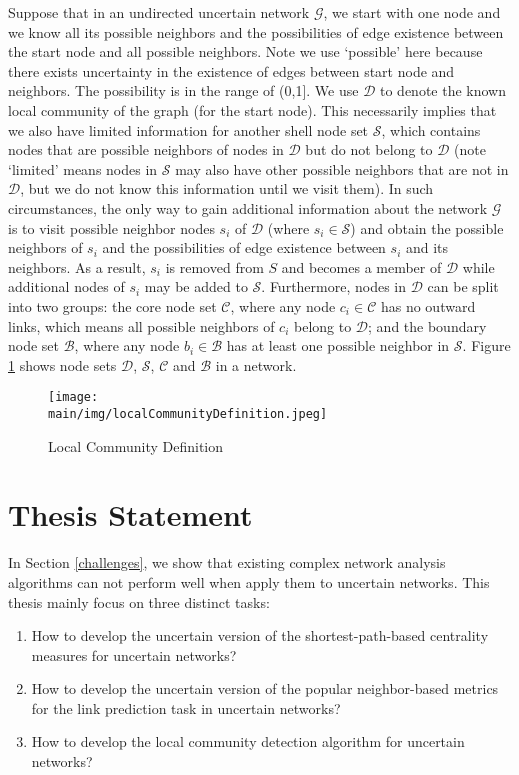 \documentclass[\main/thesis.tex]{subfiles}
\begin{document}
Suppose that in an undirected uncertain network $\mathcal{G}$, we start with one node and we know all its possible neighbors and the possibilities of edge existence between the start node and all possible neighbors. Note we use `possible' here because there exists uncertainty in the existence of edges between start node and neighbors. The possibility is in the range of (0,1]. We use $\mathcal{D}$ to denote the known local community of the graph (for the start node). This necessarily implies that we also have limited information for another shell node set $\mathcal{S}$, which contains nodes that are possible neighbors of nodes in $\mathcal{D}$ but do not belong to $\mathcal{D}$ (note `limited' means nodes in $\mathcal{S}$ may also have other possible neighbors that are not in $\mathcal{D}$, but we do not know this information until we visit them). In such circumstances, the only way to gain additional information about the network $\mathcal{G}$ is to visit possible neighbor nodes $s_i$ of $\mathcal{D}$ (where $s_i\in \mathcal{S}$) and obtain the possible neighbors of $s_i$ and the possibilities of edge existence between $s_i$ and its neighbors. As a result, $s_i$ is removed from $S$ and becomes a member of $\mathcal{D}$ while additional nodes of $s_i$ may be added to $\mathcal{S}$. Furthermore, nodes in $\mathcal{D}$ can be split into two groups: the core node set $\mathcal{C}$, where any node $c_i\in \mathcal{C}$ has no outward links, which means all possible neighbors of $c_i$ belong to $\mathcal{D}$; and the boundary node set $\mathcal{B}$, where any node $b_i\in \mathcal{B}$ has at least one possible neighbor in $\mathcal{S}$. Figure \ref{Local_Community_Definition} shows node sets $\mathcal{D}$, $\mathcal{S}$, $\mathcal{C}$ and $\mathcal{B}$ in a network.

\begin{figure}
\centering
\texttt{[image: \\main/img/localCommunityDefinition.jpeg]}
\caption{Local Community Definition}
\label{Local_Community_Definition}
\end{figure}

\section{Thesis Statement}
In Section \ref{challenges}, we show that existing complex network analysis algorithms can not perform well when apply them to uncertain networks. This thesis mainly focus on three distinct tasks:
\begin{enumerate}
\item How to develop the uncertain version of the shortest-path-based centrality measures for uncertain networks?
\item How to develop the uncertain version of the popular neighbor-based metrics for the link prediction task in uncertain networks?
\item How to develop the local community detection algorithm for uncertain networks?
\end{enumerate}
\end{document}
